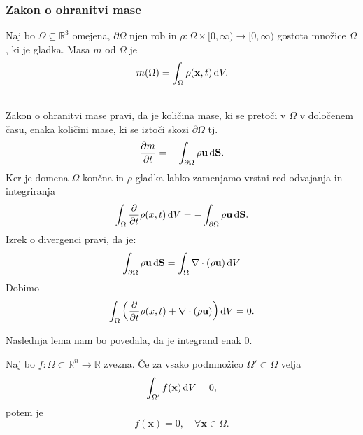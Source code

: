 \documentclass[mat2, tisk]{fmfdelo}
\newcommand{\R}{\mathbb R}
\newcommand{\bd}{\textbf}
\begin{document}
\subsubsection{Zakon o ohranitvi mase}
Naj bo $\Omega \subseteq \R^3$ omejena, $\partial \Omega$ njen rob in $\rho: \Omega \times [0, \infty) \rightarrow [0, \infty)$ 
gostota množice $\Omega$, ki je gladka. Masa $m$ od $\Omega$ je 
\begin{equation}
  m(\Omega) = \int_\Omega \rho(\bd{x}, t) \dif V.
\end{equation}
\begin{center}
\end{center}
~\\[1mm]

Zakon o ohranitvi mase pravi, da je količina mase, ki se pretoči v $\Omega$ v določenem času, 
enaka količini mase, ki se iztoči skozi $\partial\Omega$ tj.
$$
\frac{\partial m}{\partial t} = - \int_{\partial \Omega} \rho\bd{u} \dif \bd{S}.
$$
Ker je domena $\Omega$ končna in $\rho$ gladka lahko zamenjamo vrstni red odvajanja in integriranja
$$
\int_\Omega \frac{\partial}{\partial t} \rho(x, t) \dif V = - \int_{\partial \Omega} \rho \bd{u} \dif \bd{S}.
$$
Izrek o divergenci pravi, da je:
$$
\int_{\partial \Omega} \rho\bd{u} \dif \bd{S} = \int_{\Omega} \nabla \cdot (\rho\bd{u}) \dif V
$$
Dobimo 
\begin{align*}
\int_\Omega \left(\frac{\partial}{\partial t} \rho(x, t) + \nabla \cdot (\rho\bd{u})\right) \dif V = 0.
\end{align*}

Naslednja lema nam bo povedala, da je integrand enak 0.

\begin{lema}
  \label{lema:1}
Naj bo $f: \Omega \subset \R^n \rightarrow \R$ zvezna. 
Če za vsako podmnožico $\Omega' \subset \Omega$ velja 
$$
\int_{\Omega'} f(\bd{x}) \dif V = 0,
$$
potem je 
$$
f(\bd{x}) = 0, \quad \forall \bd{x} \in \Omega.
$$
\end{lema}
\end{document}
